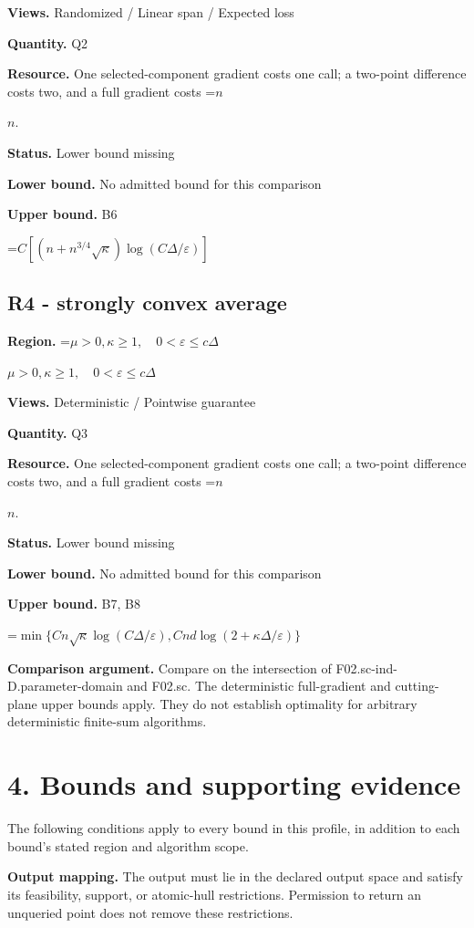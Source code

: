 \documentclass[10pt,a4paper]{article}
\newcommand{\AtlasMath}[1]{\par\begingroup\centering\setbox0=\hbox{$\displaystyle #1$}\ifdim\wd0>1.4\linewidth\typeout{ATLAS WIDE FORMULA: \the\wd0}\fi\ifdim\wd0>\linewidth\resizebox{\linewidth}{!}{\box0}\else\box0\fi\par\endgroup}
\newcommand{\AtlasInlineMath}[1]{\begingroup\setbox0=\hbox{$#1$}\ifdim\wd0>.4\linewidth\endgroup\AtlasMath{#1}\else\endgroup$#1$\fi}
\begin{document}
\textbf{Views.} Randomized / Linear span / Expected loss

\textbf{Quantity.} Q2

\textbf{Resource.} One selected-component gradient costs one call; a two-point difference costs two, and a full gradient costs \AtlasInlineMath{n}.

\textbf{Status.} Lower bound missing

\textbf{Lower bound.} No admitted bound for this comparison

\textbf{Upper bound.} B6

\AtlasMath{C[(n+n^{3/4}\sqrt\kappa)\log(C\Delta/\varepsilon)]}
\subsection{R4 - strongly convex average}
\textbf{Region.} \AtlasInlineMath{\mu>0,\kappa\ge1,\quad0<\varepsilon\le c\Delta}

\textbf{Views.} Deterministic / Pointwise guarantee

\textbf{Quantity.} Q3

\textbf{Resource.} One selected-component gradient costs one call; a two-point difference costs two, and a full gradient costs \AtlasInlineMath{n}.

\textbf{Status.} Lower bound missing

\textbf{Lower bound.} No admitted bound for this comparison

\textbf{Upper bound.} B7, B8

\AtlasMath{\min\{Cn\sqrt\kappa\log(C\Delta/\varepsilon),Cnd\log(2+\kappa\Delta/\varepsilon)\}}
\textbf{Comparison argument.} Compare on the intersection of F02.sc-ind-D.parameter-domain and F02.sc. The deterministic full-gradient and cutting-plane upper bounds apply. They do not establish optimality for arbitrary deterministic finite-sum algorithms.

\section{4. Bounds and supporting evidence}
The following conditions apply to every bound in this profile, in addition to each bound's stated region and algorithm scope.

\textbf{Output mapping.} The output must lie in the declared output space and satisfy its feasibility, support, or atomic-hull restrictions. Permission to return an unqueried point does not remove these restrictions.
\end{document}
